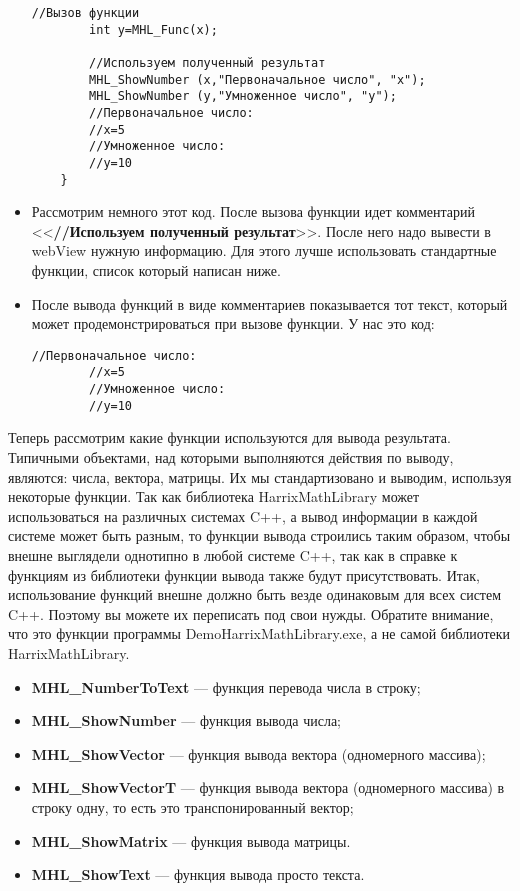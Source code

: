 \documentclass[a4paper,12pt]{article}
\begin{document}
\begin{itemize}
\begin{lstlisting}[label=examplefunction08, caption=Добавление демонстрации работы функции на примере]
        //Вызов функции
        int y=MHL_Func(x);

        //Используем полученный результат
        MHL_ShowNumber (x,"Первоначальное число", "x");
        MHL_ShowNumber (y,"Умноженное число", "y");
        //Первоначальное число:
        //x=5
        //Умноженное число:
        //y=10
    }
\end{lstlisting}
\item Рассмотрим немного этот код. После вызова функции идет комментарий <<\textbf{//Используем полученный результат}>>. После него надо вывести в webView нужную информацию. Для этого лучше использовать стандартные функции, список который написан ниже.
\item  После вывода функций в виде комментариев показывается тот текст, который может продемонстрироваться при вызове функции. У нас это код:
\begin{lstlisting}[label=examplefunction09, caption=Закомментированный результат работы функции]
        //Первоначальное число:
        //x=5
        //Умноженное число:
        //y=10
\end{lstlisting}
\end{itemize}

Теперь рассмотрим какие функции используются для вывода результата. Типичными объектами, над которыми выполняются действия по выводу, являются: числа, вектора, матрицы. Их мы стандартизовано и выводим, используя некоторые функции. Так как библиотека HarrixMathLibrary может использоваться на различных системах C++, а вывод информации в каждой системе может быть разным, то функции вывода строились таким образом, чтобы внешне выглядели однотипно в любой системе C++, так как в справке к функциям из библиотеки функции вывода также будут присутствовать. Итак, использование функций внешне должно быть везде одинаковым для всех систем C++.  Поэтому вы можете их переписать под свои нужды. Обратите внимание, что это функции программы DemoHarrixMathLibrary.exe, а не самой библиотеки HarrixMathLibrary.

\begin{itemize}
\item \textbf{MHL\_NumberToText} --- функция перевода числа в строку; 
\item \textbf{MHL\_ShowNumber} --- функция вывода числа;
\item \textbf{MHL\_ShowVector} --- функция вывода вектора (одномерного массива);
\item \textbf{MHL\_ShowVectorT} --- функция вывода вектора (одномерного массива) в строку одну, то есть это транспонированный вектор;
\item \textbf{MHL\_ShowMatrix} --- функция вывода матрицы.
\item \textbf{MHL\_ShowText} --- функция вывода просто текста.
\end{itemize}
\end{document}
